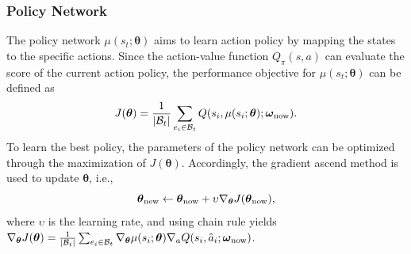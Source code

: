 \documentclass[lettersize,journal]{IEEEtran}
\begin{document}
\subsubsection{Policy Network}
The policy network $\mu(s_t;\boldsymbol{\theta})$ aims to learn action policy by mapping the states to the specific actions. Since the action-value function $Q_\pi(s,a)$ can evaluate the score of the current action policy, the performance objective for $\mu(s_t;\boldsymbol{\theta})$ can be defined as \cite{silver2014deterministic}
\begin{equation}\label{eqn:evaLoss}
J({\boldsymbol{\theta }}) = \frac{1}{{|{{\cal B}_t}|}}\sum\limits_{{e_i} \in {{\cal B}_t}} {Q({s_i},\mu ({s_i};{\boldsymbol{\theta }});{\boldsymbol{\omega }_{\rm now}})}.
\end{equation}
To learn the best policy, the parameters of the policy network can be optimized through the maximization of $J({\boldsymbol{\theta }})$. Accordingly, the gradient ascend method is used to update $\boldsymbol{\theta }$, i.e.,
\begin{equation}\label{eqn:theta_up}
   \boldsymbol{\theta }_{\rm new} \leftarrow  \boldsymbol{\theta }_{\rm now} + \upsilon {\nabla _{\boldsymbol{\theta }}}J({\boldsymbol{\theta }_{\rm now}}),
\end{equation}
where $\upsilon $ is the learning rate, and using chain rule yields ${\nabla _{\boldsymbol{\theta }}}J({\boldsymbol{\theta }}) = \frac{1}{{|{{\cal B}_t}|}}\sum\nolimits_{{e_i} \in {\mathcal B_t}} {{\nabla _{\boldsymbol{\theta }}}\mu ({s_i};{\boldsymbol{\theta }}){\nabla _a}Q({s_i},{{\hat a}_i};{{\boldsymbol{\omega }}_{{\rm{now}}}})} $.

\end{document}
